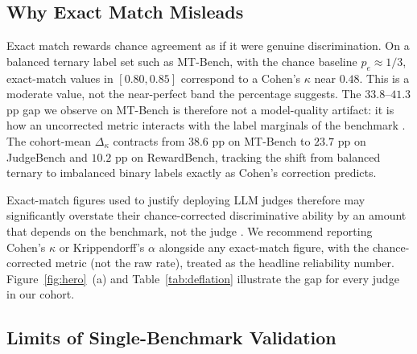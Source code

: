 \documentclass[11pt]{article}
\begin{document}
\subsection{Why Exact Match Misleads}


Exact match rewards chance agreement as if it were genuine discrimination. On a balanced ternary label set such as MT-Bench, with the chance baseline $p_e \approx 1/3$, exact-match values in $[0.80, 0.85]$ correspond to a Cohen's $\kappa$ near $0.48$. This is a moderate value, not the near-perfect band the percentage suggests. The $33.8$--$41.3$ pp gap we observe on MT-Bench is therefore not a model-quality artifact: it is how an uncorrected metric interacts with the label marginals of the benchmark \citep{cohen1960coefficient,guerdan2025validating}. The cohort-mean $\Delta_\kappa$ contracts from $38.6$ pp on MT-Bench to $23.7$ pp on JudgeBench and $10.2$ pp on RewardBench, tracking the shift from balanced ternary to imbalanced binary labels exactly as Cohen's correction predicts.

Exact-match figures used to justify deploying LLM judges therefore may significantly overstate their chance-corrected discriminative ability by an amount that depends on the benchmark, not the judge \citep{han2025judgesverdict,collot2025balanced}. We recommend reporting Cohen's $\kappa$ or Krippendorff's $\alpha$ alongside any exact-match figure, with the chance-corrected metric (not the raw rate), treated as the headline reliability number. Figure~\ref{fig:hero}~(a) and Table~\ref{tab:deflation} illustrate the gap for every judge in our cohort.

\subsection{Limits of Single-Benchmark Validation}

\end{document}

